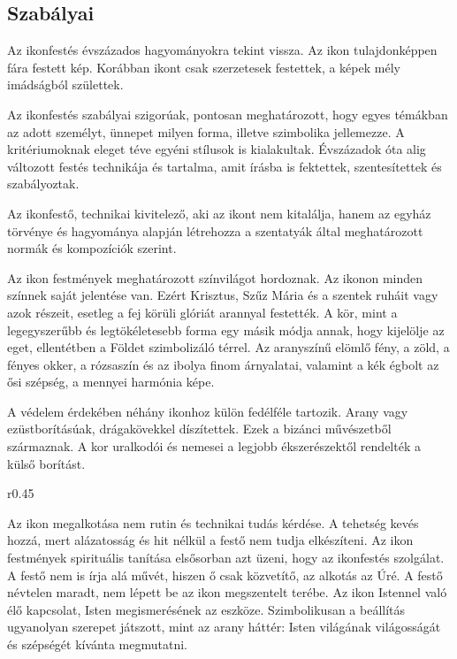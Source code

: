 \subsection*{Szabályai}

Az ikonfestés évszázados hagyományokra tekint vissza. Az ikon tulajdonképpen fára festett kép. Korábban ikont csak szerzetesek festettek, a képek mély imádságból születtek.

Az ikonfestés szabályai szigorúak, pontosan meghatározott, hogy egyes témákban az adott személyt, ünnepet milyen forma, illetve szimbolika jellemezze. A kritériumoknak eleget téve egyéni stílusok is kialakultak. Évszázadok óta alig változott festés technikája és tartalma, amit írásba is fektettek, szentesítettek és szabályoztak.

Az ikonfestő, technikai kivitelező, aki az ikont nem kitalálja, hanem az egyház törvénye és hagyománya alapján létrehozza a szentatyák által meghatározott normák és kompozíciók szerint.

Az ikon festmények meghatározott színvilágot hordoznak. Az ikonon minden színnek saját jelentése van. Ezért Krisztus, Szűz Mária és a szentek ruháit vagy azok részeit, esetleg a fej körüli glóriát arannyal festették. A kör, mint a legegyszerűbb és legtökéletesebb forma egy másik módja annak, hogy kijelölje az eget, ellentétben a Földet szimbolizáló térrel. Az aranyszínű elömlő fény, a zöld, a fényes okker, a rózsaszín és az ibolya finom árnyalatai, valamint a kék égbolt az ősi szépség, a mennyei harmónia képe.

A védelem érdekében néhány ikonhoz külön fedélféle tartozik. Arany vagy ezüstborításúak, drágakövekkel díszítettek. Ezek a bizánci művészetből származnak. A kor uralkodói és nemesei a legjobb ékszerészektől rendelték a külső borítást.



\begin{wrapfigure}{r}{0.45\textwidth}
\end{wrapfigure}

Az ikon megalkotása nem rutin és technikai tudás kérdése. A tehetség kevés hozzá, mert alázatosság és hit nélkül a festő nem tudja elkészíteni. Az ikon festmények spirituális tanítása elsősorban azt üzeni, hogy az ikonfestés szolgálat. A festő nem is írja alá művét, hiszen ő csak közvetítő, az alkotás az Úré. A festő névtelen maradt, nem lépett be az ikon megszentelt terébe. Az ikon Istennel való élő kapcsolat, Isten megismerésének az eszköze. Szimbolikusan a beállítás ugyanolyan szerepet játszott, mint az arany háttér: Isten világának világosságát és szépségét kívánta megmutatni.

